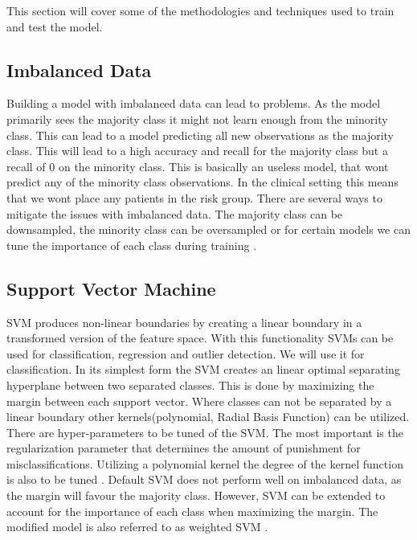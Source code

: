 This section will cover some of the methodologies and techniques used to train and test the model.

\subsection{Imbalanced Data}
Building a model with imbalanced data can lead to problems. As the model primarily sees the majority class it might not learn enough from the minority class. This can lead to a model predicting all new observations as the majority class. This will lead to a high accuracy and recall for the majority class but a recall of 0 on the minority class. This is basically an useless model, that wont predict any of the minority class observations. In the clinical setting this means that we wont place any patients in the risk group. There are several ways to mitigate the issues with imbalanced data. The majority class can be downsampled, the minority class can be oversampled or for certain models we can tune the importance of each class during training \cite*{svm-imbalanced-data}.

\subsection{Support Vector Machine}
SVM produces non-linear boundaries by creating a linear boundary in a transformed version of the feature space. With this functionality SVMs can be used for classification, regression and outlier detection. We will use it for classification. In its simplest form the SVM creates an linear optimal separating hyperplane between two separated classes. This is done by maximizing the margin between each support vector. Where classes can not be separated by a linear boundary other kernels(polynomial, Radial Basis Function) can be utilized. There are hyper-parameters to be tuned of the SVM. The most important is the regularization parameter that determines the amount of punishment for misclassifications. Utilizing a polynomial kernel the degree of the kernel function is also to be tuned \cite{statistical-book}. Default SVM does not perform well on imbalanced data, as the margin will favour the majority class. However, SVM can be extended to account for the  importance of each class when maximizing the margin. The modified model is also referred to as weighted SVM \cite{W-SVM}.
   
